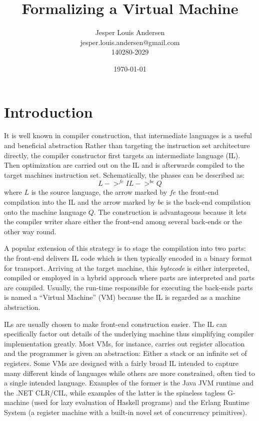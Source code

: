 \documentclass[a4paper, oneside, 10pt, draft]{memoir}
\author{Jesper Louis
  Andersen\\jesper.louis.andersen@gmail.com\\140280-2029}
\title{Formalizing a Virtual Machine}
\date{\today}
\begin{document}
\maketitle{}
\tableofcontents{}
\chapter{Introduction}

It is well known in compiler construction, that intermediate languages
is a useful and beneficial abstraction\cite{appel:1998:modern,
  mogensen:2008:basics} Rather than targeting the instruction set
architecture directly, the compiler constructor first targets an
intermediate language (IL). Then optimization are carried out on the
IL and is afterwards compiled to the target machines instruction
set. Schematically, the phases can be described as:
\begin{equation*}
  L ->^{fe} IL ->^{be} Q
\end{equation*}
where $L$ is the source language, the arrow marked by $fe$ the
front-end compilation into the IL and the arrow marked by $be$ is the
back-end compilation onto the machine language $Q$. The construction
is advantageous because it lets the compiler writer share either the
front-end among several back-ends or the other way round.

A popular extension of this strategy is to stage the compilation
into two parts: the front-end delivers IL code which is then typically
encoded in a binary format for transport. Arriving at the target
machine, this \emph{bytecode} is either interpreted, compiled or
employed in a hybrid approach where parts are interpreted and parts
are compiled. Usually, the run-time responsible for executing the
back-ends parts is named a ``Virtual Machine'' (VM) because the IL is
regarded as a machine abstraction.

ILs are usually chosen to make front-end construction easier. The IL
can specifically factor out details of the underlying machine thus
simplifying compiler implementation greatly. Most VMs, for instance,
carries out register allocation and the programmer is given an
abstraction: Either a stack or an infinite set of registers. Some VMs
are designed with a fairly broad IL intended to capture many different
kinds of languages while others are more constrained, often tied to a
single intended language. Examples of the former is the Java JVM
runtime\cite{lindholm.frank:1999:jvm} and the .NET
CLR/CIL, while examples of the latter is the spineless
tagless G-machine (used for lazy evaluation of Haskell programs) and
the Erlang Runtime System (a register machine with a built-in novel
set of concurrency primitives).
\end{document}
